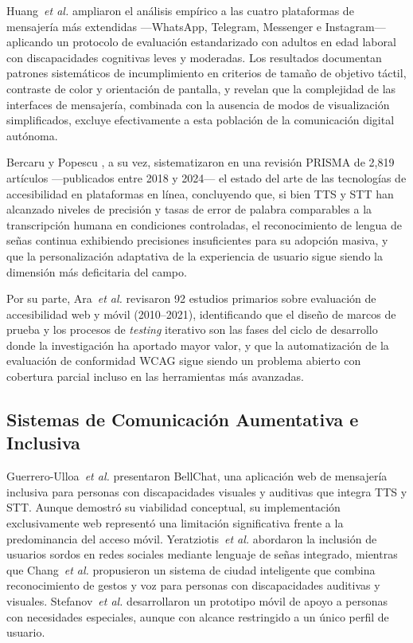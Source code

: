 \documentclass[journal]{IEEEtran}
\begin{document}
Huang~\textit{et al.} \cite{huang2025} ampliaron el an\'alisis emp\'irico a las cuatro plataformas de mensajer\'ia m\'as extendidas ---WhatsApp, Telegram, Messenger e Instagram--- aplicando un protocolo de evaluaci\'on estandarizado con adultos en edad laboral con discapacidades cognitivas leves y moderadas. Los resultados documentan patrones sistem\'aticos de incumplimiento en criterios de tama\~no de objetivo t\'actil, contraste de color y orientaci\'on de pantalla, y revelan que la complejidad de las interfaces de mensajer\'ia, combinada con la ausencia de modos de visualizaci\'on simplificados, excluye efectivamente a esta poblaci\'on de la comunicaci\'on digital aut\'onoma.

Bercaru y Popescu \cite{bercaru2024}, a su vez, sistematizaron en una revisi\'on PRISMA de 2{,}819 art\'iculos ---publicados entre 2018 y 2024--- el estado del arte de las tecnolog\'ias de accesibilidad en plataformas en l\'inea, concluyendo que, si bien TTS y STT han alcanzado niveles de precisi\'on y tasas de error de palabra comparables a la transcripci\'on humana en condiciones controladas, el reconocimiento de lengua de se\~nas continua exhibiendo precisiones insuficientes para su adopci\'on masiva, y que la personalizaci\'on adaptativa de la experiencia de usuario sigue siendo la dimensi\'on m\'as deficitaria del campo.

Por su parte, Ara~\textit{et al.} \cite{ara2024} revisaron 92 estudios primarios sobre evaluaci\'on de accesibilidad web y m\'ovil (2010--2021), identificando que el dise\~no de marcos de prueba y los procesos de \textit{testing} iterativo son las fases del ciclo de desarrollo donde la investigaci\'on ha aportado mayor valor, y que la automatizaci\'on de la evaluaci\'on de conformidad WCAG sigue siendo un problema abierto con cobertura parcial incluso en las herramientas m\'as avanzadas.

\subsection{Sistemas de Comunicaci\'on Aumentativa e Inclusiva}

Guerrero-Ulloa~\textit{et al.} \cite{guerrero2021bellchat} presentaron BellChat, una aplicaci\'on web de mensajer\'ia inclusiva para personas con discapacidades visuales y auditivas que integra TTS y STT. Aunque demostr\'o su viabilidad conceptual, su implementaci\'on exclusivamente web represent\'o una limitaci\'on significativa frente a la predominancia del acceso m\'ovil. Yeratziotis~\textit{et al.} \cite{yeratziotis2023} abordaron la inclusi\'on de usuarios sordos en redes sociales mediante lenguaje de se\~nas integrado, mientras que Chang~\textit{et al.} \cite{chang2022} propusieron un sistema de ciudad inteligente que combina reconocimiento de gestos y voz para personas con discapacidades auditivas y visuales. Stefanov~\textit{et al.} \cite{stefanov2024} desarrollaron un prototipo m\'ovil de apoyo a personas con necesidades especiales, aunque con alcance restringido a un \'unico perfil de usuario.
\end{document}
